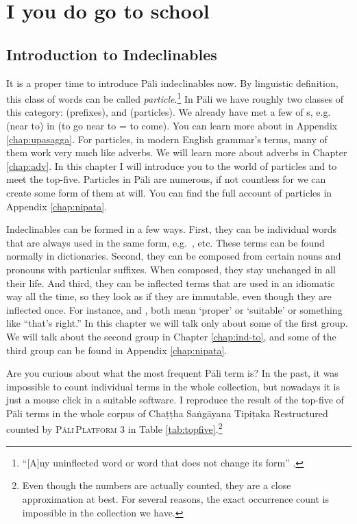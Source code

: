 \chapter{I  you do  go to school}\label{chap:ind-intro}

{}
\section*{Introduction to Indeclinables}

It is a proper time to introduce P\=ali indeclinables now. By linguistic definition, this class of words can be called \emph{particle}.\footnote{``[A]ny uninflected word or word that does not change its form'' \citep[p.~332]{brownmiller:dict}.} In P\=ali we have roughly two classes of this category:  (prefixes), and  (particles). We already have met a few of s, e.g.\  (near to) in  (to go near to = to come). You can learn more about  in Appendix \ref{chap:upasagga}. For particles, in modern English grammar's terms, many of them work very much like adverbs. We will learn more about adverbs in Chapter \ref{chap:adv}. In this chapter I will introduce you to the world of particles and to meet the top-five. Particles in P\=ali are numerous, if not countless for we can create some form of them at will. You can find the full account of particles in Appendix \ref{chap:nipata}.

Indeclinables can be formed in a few ways. First, they can be individual words that are always used in the same form, e.g.\ , etc. These terms can be found normally in dictionaries. Second, they can be composed from certain nouns and pronouns with particular suffixes. When composed, they stay unchanged in all their life. And third, they can be inflected terms that are used in an idiomatic way all the time, so they look as if they are immutable, even though they are inflected once. For instance,  and , both mean `proper' or	`suitable' or something like ``that's right.'' In this chapter we will talk only about some of the first group. We will talk about the second group in Chapter \ref{chap:ind-to}, and some of the third group can be found in Appendix \ref{chap:nipata}.

Are you curious about what the most frequent P\=ali term is? In the past, it was impossible to count individual terms in the whole collection, but nowadays it is just a mouse click in a suitable software. I reproduce the result of the top-five of P\=ali terms in the whole corpus of Cha\d t\d tha Sa\.ng\=ayana Tipi\d taka Restructured counted by \textsc{P\=ali\,Platform} 3 in Table \ref{tab:topfive}.\footnote{Even though the numbers are actually counted, they are a close approximation at best. For several reasons, the exact occurrence count is impossible in the collection we have.}

